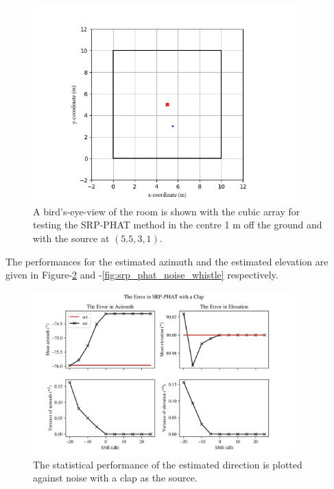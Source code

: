 \documentclass[notitlepage]{report}
\begin{document}
\begin{figure}[H]
\includegraphics[width=0.9\textwidth]{../Python/srp_phat/room_2d.png}
\centering
\caption{A bird's-eye-view of the room is shown with the cubic array for testing the SRP-PHAT method in the centre 1 \si{m} off the ground and with the source at $(5.5,3,1)$.}
\label{fig:srp_phat_room_2d}
\centering
\end{figure}

The performances for the estimated azimuth and the estimated elevation are given in Figure-\ref{fig:srp_phat_noise_clap} and -\ref{fig:srp_phat_noise_whistle} respectively.

\begin{figure}[H]
\includegraphics[width=0.9\textwidth]{../Python/srp_phat/noise/clap/plots.png}
\centering
\caption{The statistical performance of the estimated direction is plotted against noise with a clap as the source.}
\label{fig:srp_phat_noise_clap}
\centering
\end{figure}
\end{document}
